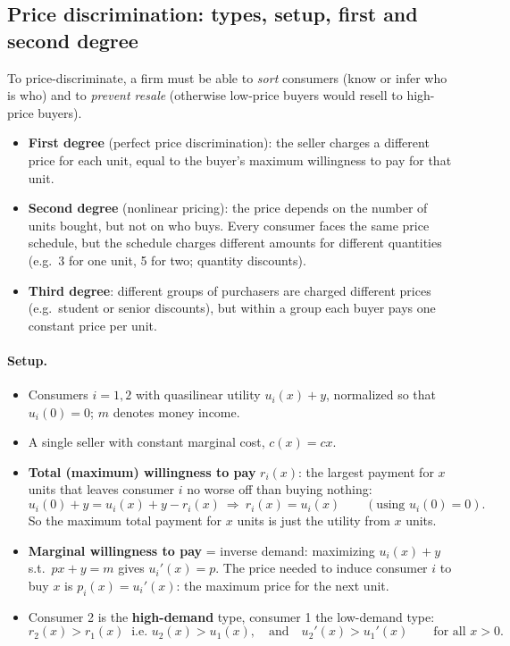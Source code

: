 \subsection{Price discrimination: types, setup, first and second degree }

To price-discriminate, a firm must be able to \emph{sort} consumers (know or infer who is who) and to \emph{prevent resale} (otherwise low-price buyers would resell to high-price buyers).

\begin{itemize}
\item \textbf{First degree} (perfect price discrimination): the seller charges a different price for each unit, equal to the buyer's maximum willingness to pay for that unit.
\item \textbf{Second degree} (nonlinear pricing): the price depends on the number of units bought, but not on who buys. Every consumer faces the same price schedule, but the schedule charges different amounts for different quantities (e.g.\ 3 for one unit, 5 for two; quantity discounts).
\item \textbf{Third degree}: different groups of purchasers are charged different prices (e.g.\ student or senior discounts), but within a group each buyer pays one constant price per unit.
\end{itemize}

\paragraph{Setup.}
\begin{itemize}
\item Consumers $i=1,2$ with quasilinear utility $u_i(x)+y$, normalized so that $u_i(0)=0$; $m$ denotes money income.
\item A single seller with constant marginal cost, $c(x)=cx$.
\item \textbf{Total (maximum) willingness to pay} $r_i(x)$: the largest payment for $x$ units that leaves consumer $i$ no worse off than buying nothing:
\[
u_i(0)+y=u_i(x)+y-r_i(x)\ \Longrightarrow\ r_i(x)=u_i(x)\qquad(\text{using } u_i(0)=0).
\]
So the maximum total payment for $x$ units is just the utility from $x$ units.
\item \textbf{Marginal willingness to pay} = inverse demand: maximizing $u_i(x)+y$ s.t.\ $px+y=m$ gives $u_i'(x)=p$. The price needed to induce consumer $i$ to buy $x$ is $p_i(x)=u_i'(x)$: the maximum price for the next unit.
\item Consumer 2 is the \textbf{high-demand} type, consumer 1 the low-demand type:
\[
r_2(x)>r_1(x)\ \text{ i.e. } u_2(x)>u_1(x),\quad\text{and}\quad u_2'(x)>u_1'(x)\qquad\text{for all } x>0 .
\]
\end{itemize}

